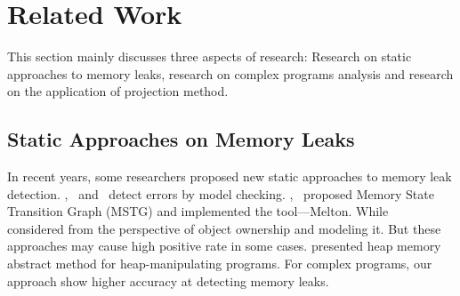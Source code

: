 \section{Related Work}\label{sec:related}
This section mainly discusses three aspects of research: Research on static approaches to memory leaks, research on complex programs analysis and research on the application of projection method.
\subsection{Static Approaches on Memory Leaks}
In recent years, some researchers proposed new static approaches to memory leak detection. \cite{XZX11},~\cite{XZX15} and~\cite{HL06} detect errors by model checking. \cite{XZX11},~\cite{XZX15} proposed Memory State Transition Graph (MSTG) and implemented the tool---Melton. While ~\cite{HL06} considered from the perspective of object ownership and modeling it. But these approaches may cause high positive rate in some cases. \cite{DWC12} presented heap memory abstract method for heap-manipulating programs. For complex programs, our approach show higher accuracy at detecting memory leaks.   

